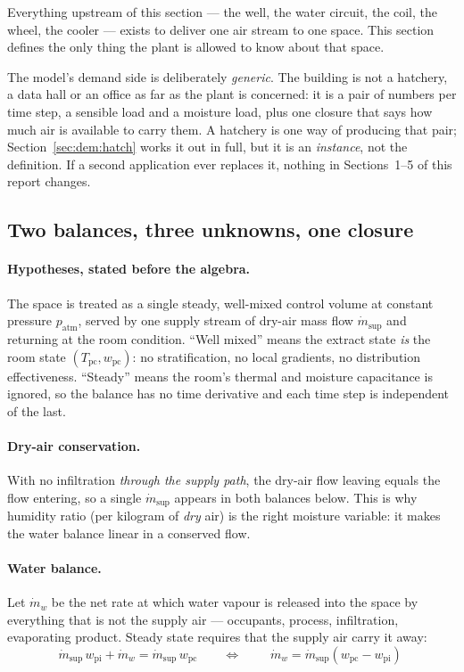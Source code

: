 \documentclass[11pt]{article}
\newcommand{\md}{\ensuremath{\dot m}}
\newcommand{\mdw}{\ensuremath{\dot m_{w}}}
\newcommand{\patm}{\ensuremath{p_{\mathrm{atm}}}}
\begin{document}
Everything upstream of this section --- the well, the water circuit, the coil, the
wheel, the cooler --- exists to deliver one air stream to one space. This section
defines the only thing the plant is allowed to know about that space.

The model's demand side is deliberately \emph{generic}. The building is not a
hatchery, a data hall or an office as far as the plant is concerned: it is a pair
of numbers per time step, a sensible load and a moisture load, plus one closure
that says how much air is available to carry them. A hatchery is one way of
producing that pair; Section~\ref{sec:dem:hatch} works it out in full, but it is
an \emph{instance}, not the definition. If a second application ever replaces it,
nothing in Sections~1--5 of this report changes.

\subsection{Two balances, three unknowns, one closure}
\label{sec:dem:balances}

\paragraph{Hypotheses, stated before the algebra.} The space is treated as a
single steady, well-mixed control volume at constant pressure $\patm$, served by one
supply stream of dry-air mass flow $\md_{\mathrm{sup}}$ and returning at the room
condition. ``Well mixed'' means the extract state \emph{is} the room state
$(T_{\mathrm{pc}},w_{\mathrm{pc}})$: no stratification, no local gradients, no
distribution effectiveness. ``Steady'' means the room's thermal and moisture
capacitance is ignored, so the balance has no time derivative and each time step
is independent of the last.

\paragraph{Dry-air conservation.} With no infiltration \emph{through the supply
path}, the dry-air flow leaving equals the flow entering, so a single
$\md_{\mathrm{sup}}$ appears in both balances below. This is why humidity ratio
(per kilogram of \emph{dry} air) is the right moisture variable: it makes the
water balance linear in a conserved flow.

\paragraph{Water balance.} Let $\mdw$ be the net rate at which water vapour is
released into the space by everything that is not the supply air --- occupants,
process, infiltration, evaporating product. Steady state requires that the supply
air carry it away:
\begin{equation}
\md_{\mathrm{sup}}\,w_{\mathrm{pi}}+\mdw=\md_{\mathrm{sup}}\,w_{\mathrm{pc}}
\qquad\Longleftrightarrow\qquad
\boxed{\;\mdw=\md_{\mathrm{sup}}\left(w_{\mathrm{pc}}-w_{\mathrm{pi}}\right)\;}
\label{eq:dem:water}
\end{equation}
\end{document}
